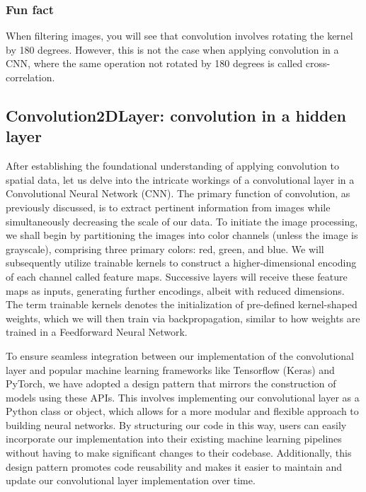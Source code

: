 \documentclass[onecolumn,10pt,cleanfoot]{asme2ej}
\begin{document}
\subsubsection{Fun fact}
When filtering images, you will see that convolution involves rotating the kernel by 180 degrees. However, this is not the case when applying convolution in a CNN, where the same operation not rotated by 180 degrees is called cross-correlation.

\subsection{Convolution2DLayer: convolution in a hidden layer}
After establishing the foundational understanding of applying convolution to spatial data, let us delve into the intricate workings of a convolutional layer in a Convolutional Neural Network (CNN). The primary function of convolution, as previously discussed, is to extract pertinent information from images while simultaneously decreasing the scale of our data. To initiate the image processing, we shall begin by partitioning the images into color channels (unless the image is grayscale), comprising three primary colors: red, green, and blue. We will subsequently utilize trainable kernels to construct a higher-dimensional encoding of each channel called feature maps. Successive layers will receive these feature maps as inputs, generating further encodings, albeit with reduced dimensions. The term trainable kernels denotes the initialization of pre-defined kernel-shaped weights, which we will then train via backpropagation, similar to how weights are trained in a Feedforward Neural Network.

To ensure seamless integration between our implementation of the convolutional layer and popular machine learning frameworks like Tensorflow (Keras) and PyTorch, we have adopted a design pattern that mirrors the construction of models using these APIs. This involves implementing our convolutional layer as a Python class or object, which allows for a more modular and flexible approach to building neural networks. By structuring our code in this way, users can easily incorporate our implementation into their existing machine learning pipelines without having to make significant changes to their codebase. Additionally, this design pattern promotes code reusability and makes it easier to maintain and update our convolutional layer implementation over time.
\end{document}
